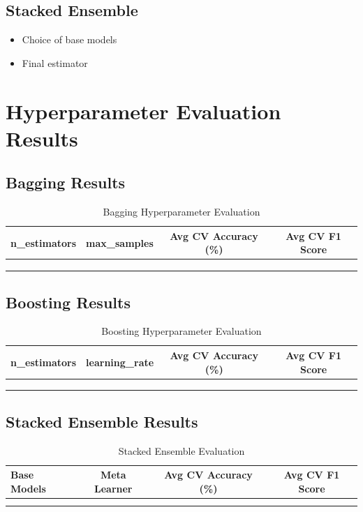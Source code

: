 \documentclass[11pt]{article}
\begin{document}
\subsection*{Stacked Ensemble}
\begin{itemize}
    \item Choice of base models
    \item Final estimator
\end{itemize}


\section*{Hyperparameter Evaluation Results}

\subsection*{Bagging Results}
\begin{table}[h!]
\centering
\caption{Bagging Hyperparameter Evaluation}
\begin{tabular}{cccc}
\toprule
n\_estimators & max\_samples & Avg CV Accuracy (\%) & Avg CV F1 Score \\
\midrule
 &  &  &  \\
 &  &  &  \\
 &  &  &  \\
\bottomrule
\end{tabular}
\end{table}

\subsection*{Boosting Results}
\begin{table}[h!]
\centering
\caption{Boosting Hyperparameter Evaluation}
\begin{tabular}{cccc}
\toprule
n\_estimators & learning\_rate & Avg CV Accuracy (\%) & Avg CV F1 Score \\
\midrule
 &  &  &  \\
 &  &  &  \\
 &  &  &  \\
\bottomrule
\end{tabular}
\end{table}

\subsection*{Stacked Ensemble Results}
\begin{table}[h!]
\centering
\caption{Stacked Ensemble Evaluation}
\begin{tabular}{lccc}
\toprule
Base Models & Meta Learner & Avg CV Accuracy (\%) & Avg CV F1 Score \\
\midrule
 &  &  &  \\
 &  &  &  \\
\bottomrule
\end{tabular}
\end{table}
\end{document}
